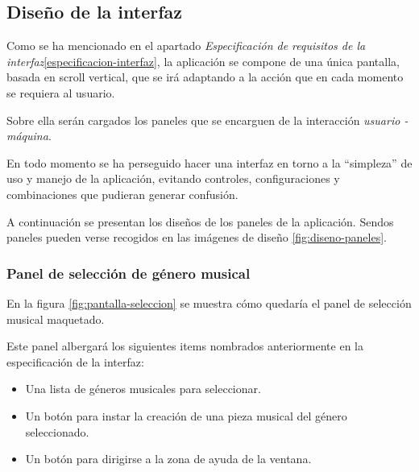 \subsection{Diseño de la interfaz}

Como se ha mencionado en el apartado \emph{Especificación de requisitos de la interfaz}\ref{especificacion-interfaz}, la aplicación se compone de una única pantalla, basada en scroll vertical, que se irá adaptando a la acción que en cada momento se requiera al usuario.

Sobre ella serán cargados los paneles que se encarguen de la interacción \emph{usuario - máquina}.

En todo momento se ha perseguido hacer una interfaz en torno a la ``simpleza'' de uso y manejo de la aplicación, evitando controles, configuraciones y combinaciones que pudieran generar confusión.

A continuación se presentan los diseños de los paneles de la aplicación. Sendos paneles pueden verse recogidos en las imágenes de diseño \ref{fig:diseno-paneles}.

\subsubsection{Panel de selección de género musical}

En la figura \ref{fig:pantalla-seleccion} se muestra cómo quedaría el panel de selección musical maquetado.


Este panel albergará los siguientes items nombrados anteriormente en la especificación de la interfaz:

\begin{itemize}
    \item Una lista de géneros musicales para seleccionar.
    \item Un botón para instar la creación de una pieza musical del género seleccionado.
    \item Un botón para dirigirse a la zona de ayuda de la ventana.
\end{itemize}

